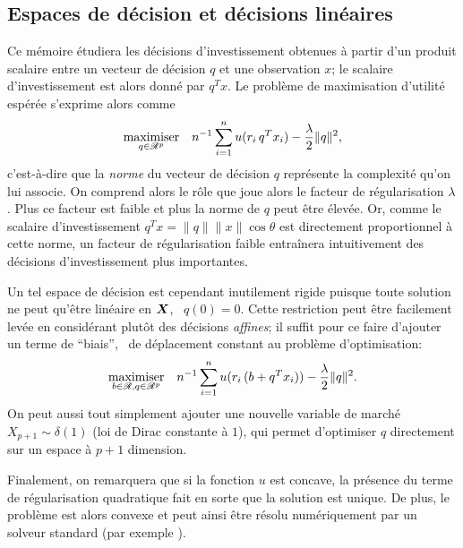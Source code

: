 \subsection{Espaces de décision et décisions linéaires}

Ce mémoire étudiera les décisions d'investissement obtenues à partir d'un produit scalaire
entre un vecteur de décision $q$ et une observation $x$; le scalaire d'investissement est
alors donné par $q^Tx$. Le problème de maximisation d'utilité espérée s'exprime alors
comme
\begin{equation}
  \label{intro:he}
  \maximizeEquation[q \in \Re^p]{n^{-1}\sumi u(r_i\,q^Tx_i) - \frac{\lambda}{2}\|q\|^2,}
\end{equation}
c'est-à-dire que la \textit{norme} du vecteur de décision $q$ représente la complexité
qu'on lui associe. On comprend alors le rôle que joue alors le facteur de régularisation
$\lambda$. Plus ce facteur est faible et plus la norme de $q$ peut être élevée. Or, comme le
scalaire d'investissement $q^Tx = \|q\|\|x\|\cos\theta$ est directement proportionnel à cette
norme, un facteur de régularisation faible entraînera intuitivement des décisions
d'investissement plus importantes.

Un tel espace de décision est cependant inutilement rigide puisque toute solution ne peut
qu'être linéaire en $\X$, \ie\ $q(0) = 0$. Cette restriction peut être facilement levée en
considérant plutôt des décisions \textit{affines}; il suffit pour ce faire d'ajouter un
terme de ``biais'', \ie\ de déplacement constant au problème d'optimisation:
\begin{equation}
  \maximizeEquation[b \in \Re, q \in \Re^p]{n^{-1}\sumi u(r_i\,(b + q^Tx_i)) - \frac{\lambda}{2}\|q\|^2.}
\end{equation}
On peut aussi tout simplement ajouter une nouvelle variable de marché
$X_{p+1} \sim \delta(1)$ (loi de Dirac constante à $1$), qui permet d'optimiser $q$ directement
sur un espace à $p+1$ dimension.

Finalement, on remarquera que si la fonction $u$ est concave, la présence du terme de
régularisation quadratique fait en sorte que la solution est unique. De plus, le problème
est alors convexe et peut ainsi être résolu numériquement par un solveur standard (par
exemple \cite{cvx,gb08}).

